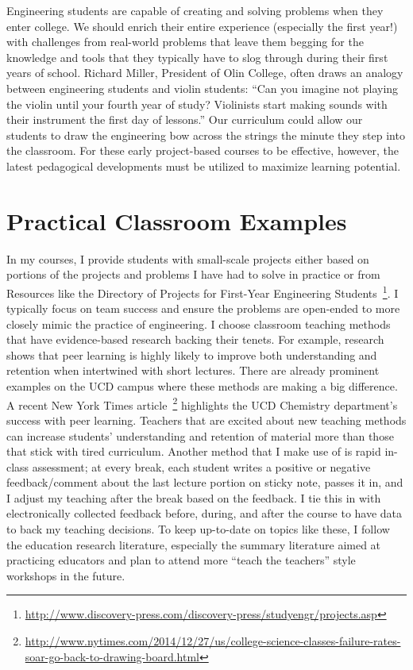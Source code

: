 \documentclass{article}
\begin{document}
Engineering students are capable of creating and solving problems when they
enter college. We should enrich their entire experience (especially the first
year!) with challenges from real-world problems that leave them begging for the
knowledge and tools that they typically have to slog through during their first
years of school. Richard Miller, President of Olin College, often draws an
analogy between engineering students and violin students: ``Can you imagine not
playing the violin until your fourth year of study? Violinists start making
sounds with their instrument the first day of lessons.'' Our curriculum could
allow our students to draw the engineering bow across the strings the minute
they step into the classroom. For these early project-based courses to be
effective, however, the latest pedagogical developments must be utilized to
maximize learning potential.

\section*{Practical Classroom Examples}
%
In my courses, I  provide students with small-scale projects either based on
portions of the projects and problems I have had to solve in practice or from
Resources like the Directory of Projects for First-Year Engineering
Students~\footnote{\url{http://www.discovery-press.com/discovery-press/studyengr/projects.asp}}.
I typically focus on team success and ensure the problems are open-ended to
more closely mimic the practice of engineering. I choose classroom teaching
methods that have evidence-based research backing their tenets. For example,
research shows that peer learning is highly likely to improve both
understanding and retention when intertwined with short lectures. There are
already prominent examples on the UCD campus where these methods are making a
big difference. A recent New York Times
article~\footnote{\url{http://www.nytimes.com/2014/12/27/us/college-science-classes-failure-rates-soar-go-back-to-drawing-board.html}}
highlights the UCD Chemistry department's success with peer learning. Teachers
that are excited about new teaching methods can increase students'
understanding and retention of material more than those that stick with tired
curriculum. Another method that I make use of is rapid in-class assessment; at
every break, each student writes a positive or negative feedback/comment about
the last lecture portion on sticky note, passes it in, and I adjust my teaching
after the break based on the feedback. I tie this in with electronically
collected feedback before, during, and after the course to have data to back my
teaching decisions. To keep up-to-date on topics like these, I follow the
education research literature, especially the summary literature aimed at
practicing educators and plan to attend more ``teach the teachers'' style
workshops in the future.
\end{document}
